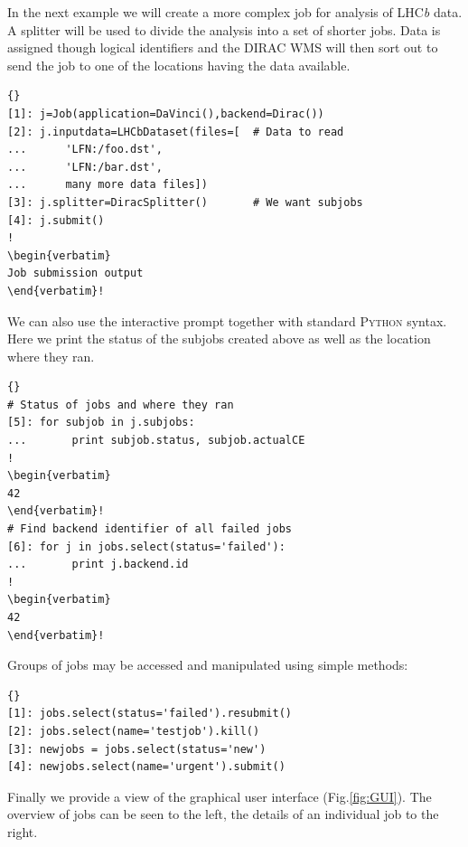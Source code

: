 \documentclass{elsart}
\def\lhcb {LHC{\em b\/}\xspace}
\def\dirac{DIRAC\xspace}
\def\python {\textsc{Python}\xspace}
\begin{document}
\vspace{-2ex}
In the next example we will create a more complex job for analysis of \lhcb
data. A splitter will be used to divide the analysis into a set of shorter
jobs. Data is assigned though logical identifiers and the \dirac WMS will then
sort out to send the job to one of the locations having the data available.
\tiny
\begin{lstlisting}[escapechar=!]{}
[1]: j=Job(application=DaVinci(),backend=Dirac())
[2]: j.inputdata=LHCbDataset(files=[  # Data to read
...      'LFN:/foo.dst',
...      'LFN:/bar.dst',
...      many more data files])
[3]: j.splitter=DiracSplitter()       # We want subjobs
[4]: j.submit()
!
\begin{verbatim}
Job submission output
\end{verbatim}!
\end{lstlisting}
\normalsize

\vspace{-2ex}
We can also use the interactive prompt together with standard \python syntax.
Here we print the status of the subjobs created above as well as the location
where they ran.
\tiny
\begin{lstlisting}[escapechar=!]{}
# Status of jobs and where they ran
[5]: for subjob in j.subjobs: 
...       print subjob.status, subjob.actualCE
!
\begin{verbatim}
42
\end{verbatim}!
# Find backend identifier of all failed jobs
[6]: for j in jobs.select(status='failed'):
...       print j.backend.id
!
\begin{verbatim}
42
\end{verbatim}!
\end{lstlisting}
\normalsize

\vspace{-2ex}

Groups of jobs may be accessed and manipulated using simple methods:

\tiny
\begin{lstlisting}[escapechar=!]{}
[1]: jobs.select(status='failed').resubmit()
[2]: jobs.select(name='testjob').kill()
[3]: newjobs = jobs.select(status='new')
[4]: newjobs.select(name='urgent').submit()
\end{lstlisting}
\normalsize

\vspace{-2ex}

Finally we provide a view of the graphical user interface
(Fig.\ref{fig:GUI}). The overview of jobs can be seen to the left, the
details of an individual job to the right.
\end{document}
